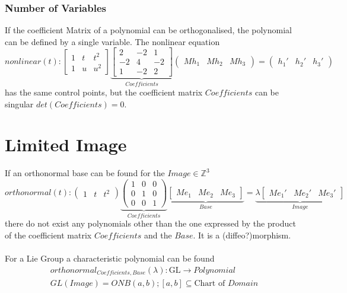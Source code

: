 \documentclass{report}
\begin{document}
\subsection{Number of Variables}
If the coefficient Matrix of a polynomial can be orthogonalised, the polynomial can be defined by a single variable. The nonlinear equation
\begin{equation}
nonlinear(t):
\begin{bmatrix}
1 & t & t^2\\
1 & u & u^2
\end{bmatrix}
\underbrace{\begin{bmatrix}
2 & -2 & 1\\
-2 & 4 & -2\\
1 & -2 & 2
\end{bmatrix}}_{Coefficients}
\begin{pmatrix}
Mh_{1} & Mh_{2} & Mh_{3}
\end{pmatrix}
=
\begin{pmatrix}
h_{1}' & h_{2}' & h_{3}'
\end{pmatrix}
\end{equation}
has the same control points, but the coefficient matrix $Coefficients$ can be singular $det(Coefficients)=0$.

\chapter{Limited Image}
If an orthonormal base can be found for the $Image \in \mathbb{Z}^3$
\begin{equation}
orthonormal(t):
\begin{pmatrix}
1 & t & t^2
\end{pmatrix}
\underbrace{\begin{pmatrix}
1 & 0 & 0\\
0 & 1 & 0\\
0 & 0 & 1
\end{pmatrix}}_{Coefficients}
\underbrace{\begin{bmatrix}
Me_{1} & Me_{2} & Me_{3}
\end{bmatrix}}_{Base}
=
\underbrace{
\lambda
\begin{bmatrix}
Me_{1}' & Me_{2}' & Me_{3}'
\end{bmatrix}}_{Image}
\end{equation}
there do not exist any polynomials other than the one expressed by the product of the coefficient matrix $Coefficients$ and the $Base$. It is a (diffeo?)morphism.\\\\
For a Lie Group a characteristic polynomial can be found
\begin{align}
orthonormal_{Coefficients,Base}(\lambda): \text{GL} \rightarrow Polynomial\\
GL(Image) = ONB(a,b); [a,b] \subseteq \text{Chart of }Domain
\end{align}
\end{document}
